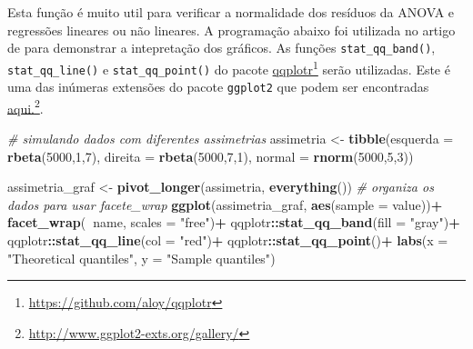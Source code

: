 \documentclass[
]{book}
\newenvironment{Shaded}{\begin{snugshade}}{\end{snugshade}}
\newcommand{\CommentTok}[1]{\textcolor[rgb]{0.56,0.35,0.01}{\textit{#1}}}
\newcommand{\DataTypeTok}[1]{\textcolor[rgb]{0.13,0.29,0.53}{#1}}
\newcommand{\DecValTok}[1]{\textcolor[rgb]{0.00,0.00,0.81}{#1}}
\newcommand{\KeywordTok}[1]{\textcolor[rgb]{0.13,0.29,0.53}{\textbf{#1}}}
\newcommand{\NormalTok}[1]{#1}
\newcommand{\OperatorTok}[1]{\textcolor[rgb]{0.81,0.36,0.00}{\textbf{#1}}}
\newcommand{\StringTok}[1]{\textcolor[rgb]{0.31,0.60,0.02}{#1}}
\begin{document}
Esta função é muito util para verificar a normalidade dos resíduos da ANOVA e regressões lineares ou não lineares. A programação abaixo foi utilizada no artigo de \citet{Lucio2017} para demonstrar a intepretação dos gráficos. As funções \texttt{stat\_qq\_band()}, \texttt{stat\_qq\_line()} e \texttt{stat\_qq\_point()} do pacote \href{https://github.com/aloy/qqplotr}{qqplotr}\footnote{\url{https://github.com/aloy/qqplotr}} serão utilizadas. Este é uma das inúmeras extensões do pacote \texttt{ggplot2} que podem ser encontradas \href{http://www.ggplot2-exts.org/gallery/}{aqui.}\footnote{\url{http://www.ggplot2-exts.org/gallery/}}.

\begin{Shaded}
\begin{Highlighting}[]
\CommentTok{# simulando dados com diferentes assimetrias}
\NormalTok{assimetria <-}\StringTok{ }\KeywordTok{tibble}\NormalTok{(}\DataTypeTok{esquerda =} \KeywordTok{rbeta}\NormalTok{(}\DecValTok{5000}\NormalTok{,}\DecValTok{1}\NormalTok{,}\DecValTok{7}\NormalTok{),}
                     \DataTypeTok{direita =} \KeywordTok{rbeta}\NormalTok{(}\DecValTok{5000}\NormalTok{,}\DecValTok{7}\NormalTok{,}\DecValTok{1}\NormalTok{),}
                     \DataTypeTok{normal =} \KeywordTok{rnorm}\NormalTok{(}\DecValTok{5000}\NormalTok{,}\DecValTok{5}\NormalTok{,}\DecValTok{3}\NormalTok{))}

\NormalTok{assimetria_graf <-}\StringTok{ }\KeywordTok{pivot_longer}\NormalTok{(assimetria, }\KeywordTok{everything}\NormalTok{()) }\CommentTok{# organiza os dados para usar facete_wrap}
\KeywordTok{ggplot}\NormalTok{(assimetria_graf, }\KeywordTok{aes}\NormalTok{(}\DataTypeTok{sample =}\NormalTok{ value))}\OperatorTok{+}
\StringTok{       }\KeywordTok{facet_wrap}\NormalTok{(}\OperatorTok{~}\NormalTok{name, }\DataTypeTok{scales =} \StringTok{"free"}\NormalTok{)}\OperatorTok{+}
\StringTok{       }\NormalTok{qqplotr}\OperatorTok{::}\KeywordTok{stat_qq_band}\NormalTok{(}\DataTypeTok{fill =} \StringTok{"gray"}\NormalTok{)}\OperatorTok{+}
\StringTok{       }\NormalTok{qqplotr}\OperatorTok{::}\KeywordTok{stat_qq_line}\NormalTok{(}\DataTypeTok{col =} \StringTok{"red"}\NormalTok{)}\OperatorTok{+}
\StringTok{       }\NormalTok{qqplotr}\OperatorTok{::}\KeywordTok{stat_qq_point}\NormalTok{()}\OperatorTok{+}
\KeywordTok{labs}\NormalTok{(}\DataTypeTok{x =} \StringTok{"Theoretical quantiles"}\NormalTok{, }\DataTypeTok{y =} \StringTok{"Sample quantiles"}\NormalTok{)}
\end{Highlighting}
\end{Shaded}
\end{document}
